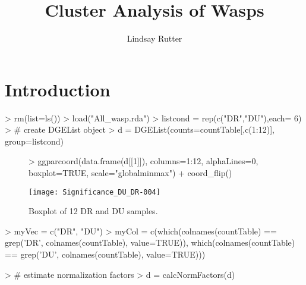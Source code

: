 \documentclass{article}
\begin{document}


\author{Lindsay Rutter}
\title{Cluster Analysis of Wasps}

\maketitle

  
\section*{Introduction}


\begin{Schunk}
\begin{Sinput}
> rm(list=ls())
> load("All_wasp.rda")
> listcond = rep(c("DR","DU"),each= 6)
> # create DGEList object
> d = DGEList(counts=countTable[,c(1:12)], group=listcond)
\end{Sinput}
\end{Schunk}

\begin{figure}[H]
\centering
\begin{Schunk}
\begin{Sinput}
> ggparcoord(data.frame(d[[1]]), columns=1:12, alphaLines=0, boxplot=TRUE, scale="globalminmax") + coord_flip()
\end{Sinput}
\end{Schunk}
\texttt{[image: Significance\_DU\_DR-004]}
\caption{Boxplot of 12 DR and DU samples.}
\label{BoxAll}
\end{figure}

\begin{Schunk}
\begin{Sinput}
> myVec = c("DR", "DU")
> myCol = c(which(colnames(countTable) == grep('DR', colnames(countTable), value=TRUE)), which(colnames(countTable) == grep('DU', colnames(countTable), value=TRUE)))
\end{Sinput}
\end{Schunk}


\begin{Schunk}
\begin{Sinput}
> # estimate normalization factors
> d = calcNormFactors(d)
\end{Sinput}
\end{Schunk}
\end{document}
